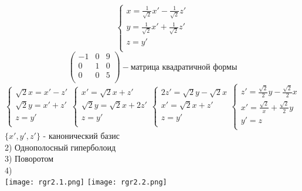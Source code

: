 \documentclass{article}
\begin{document}
    \begin{equation*}
        \begin{cases}
            x = \frac{1}{\sqrt{2}}x' - \frac{1}{\sqrt{2}}z'\\
            y = \frac{1}{\sqrt{2}}x' + \frac{1}{\sqrt{2}}z'\\
            z = y'\\
        \end{cases}
    \end{equation*}
    \begin{equation*}
        \begin{pmatrix}
            -1& 0& 9\\
            0& 1& 0\\
            0& 0& 5\\
        \end{pmatrix}
        - \text{матрица квадратичной формы}
    \end{equation*}
    \begin{equation*}
        \begin{cases}
            \sqrt{2}x=x'-z'\\
            \sqrt{2}y=x'+z'\\
            z=y'\\
        \end{cases}
        \begin{cases}
            x'=\sqrt{2}x+z'\\
            \sqrt{2}y=\sqrt{2}x+2z'\\
            z=y'\\
        \end{cases}
        \begin{cases}
            2z'=\sqrt{2}y-\sqrt{2}x\\
            x'=\sqrt{2}x+z'\\
            z=y'\\
        \end{cases}
        \begin{cases}
            z'=\frac{\sqrt{2}}{2}y-\frac{\sqrt{2}}{2}x\\
            x'=\frac{\sqrt{2}}{x}+\frac{\sqrt{2}}{2}y\\
            y'=z\\
        \end{cases}
    \end{equation*}
    $\{x', y', z'\}$ - канонический базис\\
    2) Однополосный гиперболоид \\
    3) Поворотом \\
    4)\\
    \texttt{[image: rgr2.1.png]}
    \texttt{[image: rgr2.2.png]}
    
\end{document}
